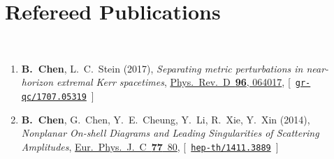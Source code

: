 \newcommand{\grqc}[1]{\href{http://arxiv.org/abs/#1}{\texttt{gr-qc/#1}}}
\newcommand{\hepth}[1]{\href{http://arxiv.org/abs/#1}{\texttt{hep-th/#1}}}


\newcommand{\baoyi}[1]{\textbf{B.~Chen},}


\section*{\sc Refereed Publications}~
\vspace{-.2in}

\begin{enumerate}

    \item
    \baoyi,
    L.~C.~Stein
    (2017),
    {\it Separating metric perturbations in near-horizon extremal Kerr spacetimes},
    \href{http://dx.doi.org/10.1103/PhysRevD.96.064017}{Phys.~Rev.~D~{\bf 96}, 064017},
    [~\grqc{1707.05319}~]

    \item 
    \baoyi,
    G.~Chen,
    Y.~E.~Cheung,  
    Y.~Li,         
    R.~Xie,
    Y.~Xin
    (2014),
    {\it Nonplanar On-shell Diagrams and Leading Singularities of Scattering Amplitudes},
    \href{http://dx.doi.org/10.1140/epjc/s10052-017-4659-2}{Eur.~Phys.~J.~C~{\bf77}~80},
    [~\hepth{1411.3889}~]
\end{enumerate}

